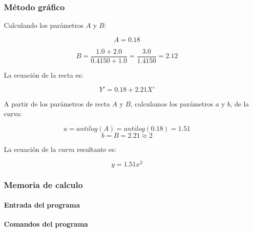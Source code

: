 \documentclass[letter,11pt]{article}
\begin{document}
\subsubsection{Método gráfico}
Calculando los parámetros $A$ y $B$:

\begin{equation*}
    A = 0.18
\end{equation*}

\begin{equation*}
    B = \frac{1.0+2.0}{0.4150+1.0} = \frac{3.0}{1.4150} = 2.12
\end{equation*}

La ecuación de la recta es:

\begin{equation*}
    Y' = 0.18 + 2.21 X'
\end{equation*}

A partir de los parámetros de recta $A$ y $B$, calculamos los parámetros $a$ y
$b$, de la curva:

\begin{equation*}
    a = antilog(A) = antilog(0.18) = 1.51
\end{equation*}
\begin{equation*}
    b = B = 2.21 \approx 2
\end{equation*}

La ecuación de la curva resultante es:

\begin{equation}
    y = 1.51 x^2
\end{equation}

\subsubsection{Memoria de calculo}

\paragraph{Entrada del programa}
\begin{alltt}
\footnotesize

\normalsize
\end{alltt}

\paragraph{Comandos del programa}
\begin{alltt}
\footnotesize

\normalsize
\end{alltt}
\end{document}
